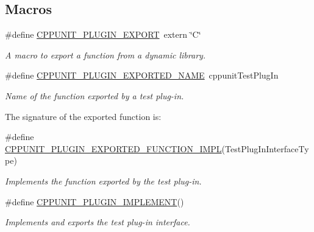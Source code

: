 \subsection*{Macros}
\begin{DoxyCompactItemize}
\item 
\#define \hyperlink{group___writing_test_plug_in_ga477408f06c41af1d46b8f17f21b3b5d6}{C\+P\+P\+U\+N\+I\+T\+\_\+\+P\+L\+U\+G\+I\+N\+\_\+\+E\+X\+P\+O\+R\+T}~extern \char`\"{}C\char`\"{}
\begin{DoxyCompactList}\small\item\em A macro to export a function from a dynamic library. \end{DoxyCompactList}\item 
\#define \hyperlink{group___writing_test_plug_in_gae7a1d474c7762e1bed3972b3d8fc11d6}{C\+P\+P\+U\+N\+I\+T\+\_\+\+P\+L\+U\+G\+I\+N\+\_\+\+E\+X\+P\+O\+R\+T\+E\+D\+\_\+\+N\+A\+M\+E}~cppunit\+Test\+Plug\+In
\begin{DoxyCompactList}\small\item\em Name of the function exported by a test plug-\/in.

The signature of the exported function is\+: \end{DoxyCompactList}\item 
\#define \hyperlink{group___writing_test_plug_in_ga81bfba0323e2c7ca7dfd6767db813a5b}{C\+P\+P\+U\+N\+I\+T\+\_\+\+P\+L\+U\+G\+I\+N\+\_\+\+E\+X\+P\+O\+R\+T\+E\+D\+\_\+\+F\+U\+N\+C\+T\+I\+O\+N\+\_\+\+I\+M\+P\+L}(Test\+Plug\+In\+Interface\+Type)
\begin{DoxyCompactList}\small\item\em Implements the function exported by the test plug-\/in. \end{DoxyCompactList}\item 
\#define \hyperlink{group___writing_test_plug_in_ga705897c323d9381ac1b99a45e953e4ff}{C\+P\+P\+U\+N\+I\+T\+\_\+\+P\+L\+U\+G\+I\+N\+\_\+\+I\+M\+P\+L\+E\+M\+E\+N\+T}()
\begin{DoxyCompactList}\small\item\em Implements and exports the test plug-\/in interface.


\end{DoxyCompactList}
\end{DoxyCompactItemize}
